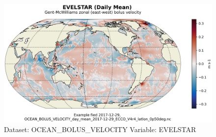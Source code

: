 \begin{figure}[H]
\centering
\includegraphics[scale=0.55]{../images/plots/latlon_plots/Gent-McWilliams_Ocean_Bolus_Velocity/EVELSTAR.png}
\caption{Dataset: OCEAN\_BOLUS\_VELOCITY Variable: EVELSTAR}
\label{tab:table-OCEAN_BOLUS_VELOCITY_EVELSTAR-Plot}
\end{figure}
\pagebreak
